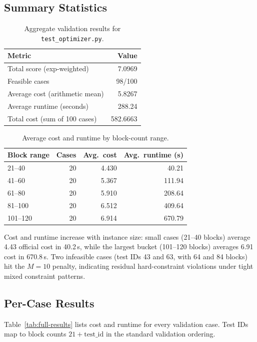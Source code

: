 \documentclass[11pt]{article}
\begin{document}
\subsection{Summary Statistics}

\begin{table}[htbp]
\centering
\caption{Aggregate validation results for \texttt{test\_optimizer.py}.}
\begin{tabular}{lr}
\toprule
Metric & Value \\
\midrule
Total score (exp-weighted) & 7.0969 \\
Feasible cases & 98/100 \\
Average cost (arithmetic mean) & 5.8267 \\
Average runtime (seconds) & 288.24 \\
Total cost (sum of 100 cases) & 582.6663 \\
\bottomrule
\end{tabular}
\end{table}

\begin{table}[htbp]
\centering
\caption{Average cost and runtime by block-count range.}
\begin{tabular}{lrrr}
\toprule
Block range & Cases & Avg.\ cost & Avg.\ runtime (s) \\
\midrule
21--40 & 20 & 4.430 & 40.21 \\
41--60 & 20 & 5.367 & 111.94 \\
61--80 & 20 & 5.910 & 208.64 \\
81--100 & 20 & 6.512 & 409.64 \\
101--120 & 20 & 6.914 & 670.79 \\
\bottomrule
\end{tabular}
\end{table}

Cost and runtime increase with instance size: small cases (21--40 blocks) average 4.43 official cost in 40.2\,s, while the largest bucket (101--120 blocks) averages 6.91 cost in 670.8\,s. Two infeasible cases (test IDs 43 and 63, with 64 and 84 blocks) hit the $M{=}10$ penalty, indicating residual hard-constraint violations under tight mixed constraint patterns.

\subsection{Per-Case Results}

Table~\ref{tab:full-results} lists cost and runtime for every validation case. Test IDs map to block counts $21 + \text{test\_id}$ in the standard validation ordering.
\end{document}
